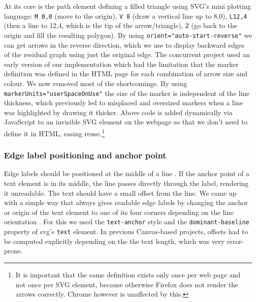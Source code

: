 At its core is the path element defining a filled triangle using SVG's mini plotting language: \texttt{M 0,0} (move to the origin), \texttt{V 8} (draw a vertical line up to 8,0), \texttt{L12,4} (then a line to 12,4, which is the tip of the arrow/triangle), \texttt{Z} (go back to the origin and fill the resulting polygon). By using {\footnotesize\texttt{orient="auto-start-reverse"}} we can get arrows in the reverse direction, which we use to display backward edges of the residual graph using just the original edge.
The concurrent project \cite{feil2016idp} used an early version of our implementation which had the limitation that the marker definition was defined in the HTML page for each combination of arrow size and colour. We now removed most of the shortcomings. By using {\footnotesize\texttt{markerUnits="userSpaceOnUse"}} the size of the marker is independent of the line thickness, which previously led to misplaced and oversized markers when a line was highlighted by drawing it thicker. Above code is added dynamically via JavaScript to an invisible SVG element on the webpage so that we don't need to define it in HTML, easing reuse.\footnote{It is important that the same definition exists only once per web page and not once per SVG element, because otherwise Firefox does not render the arrows correctly. Chrome however is unaffected by this.}


\subsubsection{Edge label positioning and anchor point}
Edge labels should be positioned at the middle of a line \cite{feil2016idp}. If the anchor point of a text element is in its middle, the line passes directly through the label, rendering it unreadable. The text should have a small offset from the line. We came up with a simple way that always gives readable edge labels by changing the anchor or origin of the text element to one of its four corners depending on the line orientation . For this we used the \texttt{text-anchor} style and the \texttt{dominant-baseline} property of svg's \texttt{text} element. In previous Canvas-based projects, offsets had to be computed explicitly depending on the  the text length, which was very error-prone.


